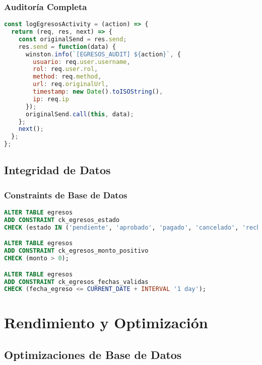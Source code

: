 \documentclass[12pt,a4paper]{article}
\begin{document}
\subsubsection{Auditoría Completa}
\begin{lstlisting}[language=JavaScript, caption=Middleware de auditoría]
const logEgresosActivity = (action) => {
  return (req, res, next) => {
    const originalSend = res.send;
    res.send = function(data) {
      winston.info(`[EGRESOS_AUDIT] ${action}`, {
        usuario: req.user.username,
        rol: req.user.rol,
        method: req.method,
        url: req.originalUrl,
        timestamp: new Date().toISOString(),
        ip: req.ip
      });
      originalSend.call(this, data);
    };
    next();
  };
};
\end{lstlisting}

\subsection{Integridad de Datos}

\subsubsection{Constraints de Base de Datos}
\begin{lstlisting}[language=SQL, caption=Constraints para integridad]
ALTER TABLE egresos
ADD CONSTRAINT ck_egresos_estado 
CHECK (estado IN ('pendiente', 'aprobado', 'pagado', 'cancelado', 'rechazado'));

ALTER TABLE egresos
ADD CONSTRAINT ck_egresos_monto_positivo 
CHECK (monto > 0);

ALTER TABLE egresos
ADD CONSTRAINT ck_egresos_fechas_validas 
CHECK (fecha_egreso <= CURRENT_DATE + INTERVAL '1 day');
\end{lstlisting}


\section{Rendimiento y Optimización}

\subsection{Optimizaciones de Base de Datos}
\end{document}
